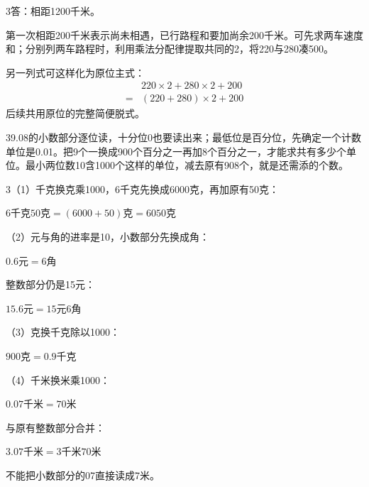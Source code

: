 \documentclass[multi=snippet,border={5bp 20bp 5bp 5bp}]{standalone}
\newenvironment{snippet}[3]{\begin{minipage}{#1bp}\color{answerred}\fontsize{#2}{#3}\selectfont\raggedright}{\end{minipage}}
\begin{document}
\begin{snippet}{505}{11.5}{14}\begin{multicols}{3}\raggedcolumns 答：相距1200千米。\par 第一次相距200千米表示尚未相遇，已行路程和要加尚余200千米。可先求两车速度和；分别列两车路程时，利用乘法分配律提取共同的2，将220与280凑500。\par 另一列式可这样化为原位主式：\[\begin{aligned}&220\times2+280\times2+200\\={}&(220+280)\times2+200\end{aligned}\]后续共用原位的完整简便脱式。\end{multicols}\end{snippet}
\begin{snippet}{505}{11.5}{14}\begin{multicols}{3}\raggedcolumns 9.08的小数部分逐位读，十分位0也要读出来；最低位是百分位，先确定一个计数单位是0.01。把9个一换成900个百分之一再加8个百分之一，才能求共有多少个单位。最小两位数10含1000个这样的单位，减去原有908个，就是还需添的个数。\end{multicols}\end{snippet}
\begin{snippet}{505}{11.5}{14}\begin{multicols}{3}\raggedcolumns （1）千克换克乘1000，6千克先换成6000克，再加原有50克：\par\noindent\(\displaystyle 6\text{千克}50\text{克}=(6000+50)\text{克}=6050\text{克}\)\allowbreak \par（2）元与角的进率是10，小数部分先换成角：\par\noindent\(\displaystyle 0.6\text{元}=6\text{角}\)\allowbreak \par 整数部分仍是15元：\par\noindent\(\displaystyle 15.6\text{元}=15\text{元}6\text{角}\)\allowbreak \par（3）克换千克除以1000：\par\noindent\(\displaystyle 900\text{克}=0.9\text{千克}\)\allowbreak \par（4）千米换米乘1000：\par\noindent\(\displaystyle 0.07\text{千米}=70\text{米}\)\allowbreak \par 与原有整数部分合并：\par\noindent\(\displaystyle 3.07\text{千米}=3\text{千米}70\text{米}\)\allowbreak \par 不能把小数部分的07直接读成7米。\end{multicols}\end{snippet}
\end{document}
